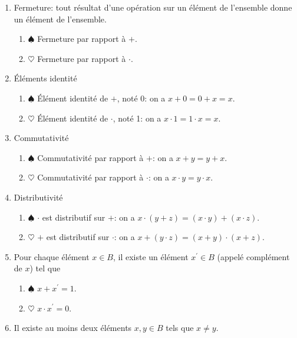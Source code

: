 \documentclass[11pt]{article}
\begin{document}
\begin{enumerate}
\item Fermeture: tout résultat d'une opération sur un élément de
l'ensemble donne un élément de l'ensemble.

\begin{enumerate}
\item \(\spadesuit\) Fermeture par rapport à \(+\).

\item \(\heartsuit\) Fermeture par rapport à \(\cdot\).
\end{enumerate}

\item Éléments identité

\begin{enumerate}
\item \(\spadesuit\) Élément identité de \(+\), noté 0: on a \(x + 0 = 0 + x = x\).

\item \(\heartsuit\) Élément identité de \(\cdot\), noté 1: on a \(x \cdot 1 = 1 \cdot x = x\).
\end{enumerate}

\item Commutativité

\begin{enumerate}
\item \(\spadesuit\) Commutativité par rapport à \(+\): on a \(x + y = y + x\).

\item \(\heartsuit\) Commutativité par rapport à \(\cdot\): on a \(x \cdot y = y
        \cdot x\).
\end{enumerate}

\item Distributivité

\begin{enumerate}
\item \(\spadesuit\) \(\cdot\) est distributif sur \(+\): on a \(x \cdot (y + z)= (x \cdot y) +
        (x \cdot z)\).

\item \(\heartsuit\) \(+\) est distributif sur \(\cdot\): on a \(x + (y \cdot z)= (x + y) \cdot
        (x + z)\).
\end{enumerate}

\item Pour chaque élément \(x \in B\), il existe un élément
\(x^{\prime} \in B\) (appelé complément de \(x\)) tel que

\begin{enumerate}
\item \(\spadesuit\) \(x + x^{\prime} = 1\).

\item \(\heartsuit\) \(x \cdot x^{\prime} = 0\).
\end{enumerate}

\item Il existe au moins deux éléments \(x, y \in B\) tels que \(x \neq y\).
\end{enumerate}
\end{document}
